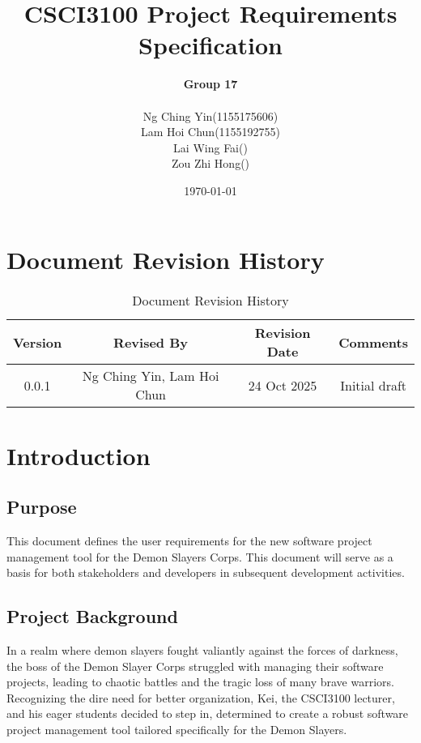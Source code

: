 \documentclass[11pt]{article}
\title{CSCI3100 Project Requirements Specification}
\author{
    \textbf{Group 17} \\[1em]
    \begin{tabular}{ll}
        Ng Ching Yin & (1155175606) \\
        Lam Hoi Chun & (1155192755) \\
        Lai Wing Fai & () \\
        Zou Zhi Hong & ()
    \end{tabular}
}
\date{\today}
\begin{document}
\maketitle

{
    \hypersetup{linkcolor=black}
    \tableofcontents
}

\newpage

\section{Document Revision History}
\begin{table}[h]
    \centering
    \caption{Document Revision History}
    \begin{tabular}{cccc}
        \toprule
        Version & Revised By & Revision Date & Comments \\
        \midrule
        0.0.1 & Ng Ching Yin, Lam Hoi Chun & 24 Oct 2025 & Initial draft \\
        \bottomrule
    \end{tabular}
    \label{tab:docs_rev_hist}
\end{table}

\section{Introduction}

\subsection{Purpose}

This document defines the user requirements for the new software project management
tool for the Demon Slayers Corps. This document will serve as a basis for both
stakeholders and developers in subsequent development activities.

\subsection{Project Background}

In a realm where demon slayers fought valiantly against the forces of darkness, the boss of
the Demon Slayer Corps struggled with managing their software projects, leading to chaotic
battles and the tragic loss of many brave warriors. Recognizing the dire need for better
organization, Kei, the CSCI3100 lecturer, and his eager students decided to step in, determined
to create a robust software project management tool tailored specifically for the Demon Slayers.
\end{document}
